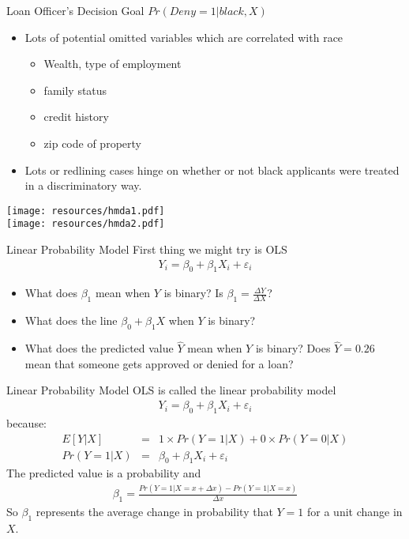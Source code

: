 \documentclass[aspectratio=169]{beamer}
\begin{document}
\begin{frame}{Loan Officer's Decision}
Goal $Pr(Deny=1 | black, X)$\\

\begin{itemize}
\item Lots of potential \alert{omitted variables} which are correlated with race
\begin{itemize}
\item Wealth, type of employment
\item family status
\item credit history
\item zip code of property
\end{itemize}
\item Lots or \alert{redlining} cases hinge on whether or not black applicants were treated in a discriminatory way.
\end{itemize}
\end{frame}

\begin{frame}
\begin{center}
\texttt{[image: resources/hmda1.pdf]}\\
\texttt{[image: resources/hmda2.pdf]}
\end{center}
\end{frame}


\begin{frame}{Linear Probability Model}
First thing we might try is OLS
\begin{eqnarray*}
Y_i  = \beta_0 + \beta_1 X_i + \varepsilon_i
\end{eqnarray*}
\begin{itemize}
\item What does $\beta_1$ mean when $Y$ is binary? Is $\beta_1  = \frac{\Delta Y}{\Delta X}$?
\item What does the line $\beta_0 + \beta_1 X$ when $Y$ is binary?
\item What does the predicted value $\hat{Y}$ mean when $Y$ is binary? Does $\hat{Y} = 0.26$ mean that someone gets approved or denied for a loan?
\end{itemize}
\end{frame}

\begin{frame}{Linear Probability Model}
OLS is called the \alert{linear probability model} 
\begin{eqnarray*}
Y_i  = \beta_0 + \beta_1 X_i + \varepsilon_i 
\end{eqnarray*}
because:
\begin{eqnarray*}
E[Y | X] &=& 1 \times Pr(Y=1 | X) + 0 \times Pr(Y=0  | X) \\
Pr(Y=1 | X) &=& \beta_0 + \beta_1 X_i + \varepsilon_i
\end{eqnarray*}
The predicted value is a \alert{probability} and 
\begin{eqnarray*}
\beta_1 = \frac{Pr(Y=1 | X =x+\Delta x) - Pr(Y=1 | X=x)}{\Delta x}
\end{eqnarray*}
So $\beta_1$ represents the average change in probability that $Y=1$ for a unit change in $X$.
\end{frame}
\end{document}
